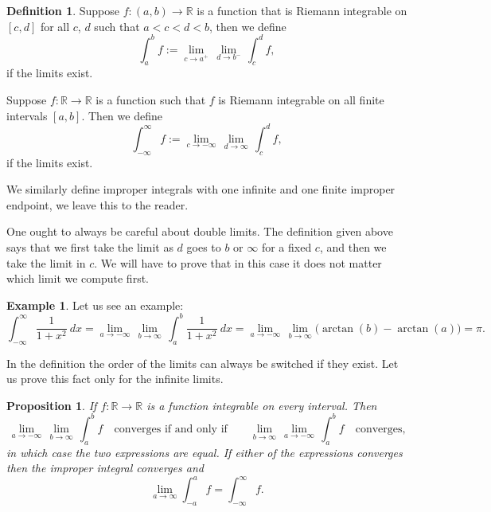 \documentclass[12pt]{book}
\newcommand{\R}{{\mathbb{R}}}
\theoremstyle{plain}
\newtheorem{prop}[thm]{Proposition}
\theoremstyle{remark}
\theoremstyle{definition}
\newtheorem{defn}[thm]{Definition}
\theoremstyle{exercise}
\theoremstyle{example}
\newtheorem{example}[thm]{Example}
\begin{document}
\begin{defn}
Suppose $f \colon (a,b) \to \R$ is a function
that is Riemann integrable on $[c,d]$ for all $c$, $d$
such that $a < c < d < b$, then we define
\begin{equation*}
\int_a^b f := \lim_{c \to a^+} \, \lim_{d \to b^-} \, \int_{c}^{d} f ,
\end{equation*}
if the limits exist.

Suppose $f \colon \R \to \R$ is a function such that
$f$ is Riemann integrable on all finite intervals $[a,b]$.  Then
we define
\begin{equation*}
\int_{-\infty}^\infty f := \lim_{c \to -\infty} \, \lim_{d \to \infty} \, \int_c^d f ,
\end{equation*}
if the limits exist.

We similarly define improper integrals with one infinite and one finite
improper endpoint, we leave this to the reader.
\end{defn}

One ought to always be careful about double limits.  The definition
given above says that we first take the limit as $d$ goes to $b$ or
$\infty$ for a fixed $c$, and then we take the limit in $c$.
We will have to prove that in this case it does not matter which limit
we compute first.

\begin{example}
Let us see an example:
\begin{equation*}
\int_{-\infty}^\infty \frac{1}{1+x^2} ~ dx
=
\lim_{a \to -\infty} \, \lim_{b \to \infty} \,
\int_{a}^b \frac{1}{1+x^2} ~ dx
=
\lim_{a \to -\infty} \, \lim_{b \to \infty}
\bigl( \arctan(b) - \arctan(a) \bigr)
=
\pi .
\end{equation*}
\end{example}

In the definition the order of the limits can always be switched if they
exist.  Let us prove this fact only for the infinite limits.

\begin{prop}
If $f \colon \R \to \R$ is a function integrable on every interval.
Then 
\begin{equation*}
\lim_{a \to -\infty} \, \lim_{b \to \infty} \, \int_a^b f
\quad \text{converges if and only if} \qquad
\lim_{b \to \infty}
\,
\lim_{a \to -\infty}
\,
\int_a^b f
\quad
\text{converges,}
\end{equation*}
in which case the two
expressions are equal.  If either of the
expressions converges then the improper integral converges and
\begin{equation*}
\lim_{a\to\infty}
\int_{-a}^a f
=
\int_{-\infty}^\infty f .
\end{equation*}
\end{prop}
\end{document}
